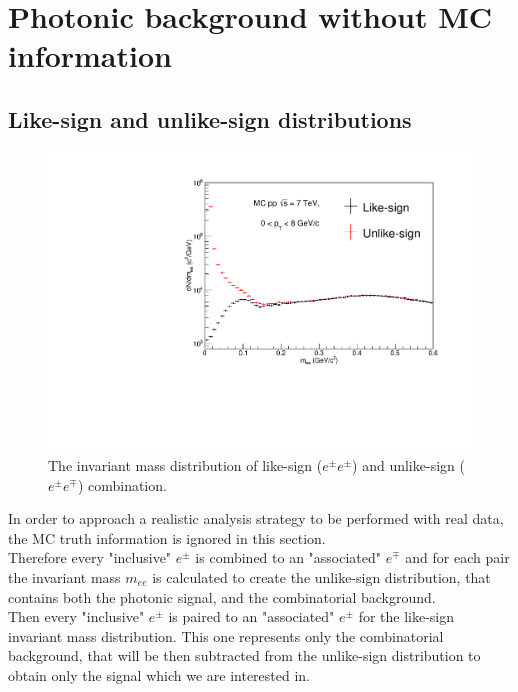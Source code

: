 \documentclass[a4paper,twocolumn,gsifonts,twoside]{gsipaper}
\begin{document}
\section{Photonic background without MC information}
\subsection{Like-sign and unlike-sign distributions}

\begin{figure}[tb]
\center
\includegraphics[scale = 0.7]{like-unlike_norm.pdf}
\caption{The invariant mass distribution of like-sign ($e^{\pm}e^{\pm}$) and unlike-sign ($e^{\pm}e^{\mp}$) combination.}
\label{LSUS}
\end{figure}

In order to approach a realistic analysis strategy to be performed with real data, the MC truth information is ignored in this section.\\
Therefore every "inclusive" $e^{\pm}$ is combined to an "associated" $e^{\mp}$ and for each pair the invariant mass $m_{ee}$ is 
calculated to create the unlike-sign distribution, that contains both the photonic signal, and the combinatorial background. \\
Then every "inclusive" $e^{\pm}$ is paired to an "associated" $e^{\pm}$ for the like-sign invariant mass distribution. 
This one represents only the combinatorial background, that will be then subtracted from the unlike-sign distribution to obtain only 
the signal which we are interested in.\\
\end{document}
